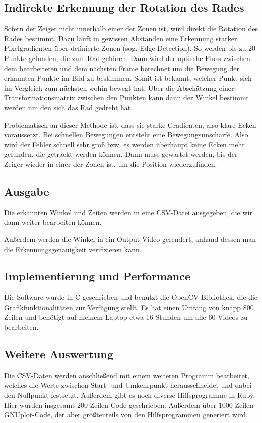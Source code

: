 \documentclass[a4paper,german,12pt,smallheadings]{scrartcl}
\begin{document}
\subsection{Indirekte Erkennung der Rotation des Rades}
Sofern der Zeiger nicht innerhalb einer der Zonen ist, wird direkt die Rotation
des Rades bestimmt. Dazu läuft in gewissen Abständen eine Erkennung starker
Pixelgradienten über definierte Zonen (sog. Edge Detection). So werden bis zu
20 Punkte gefunden, die zum Rad gehören. Dann wird der optische Fluss zwischen
dem bearbeiteten und dem nächsten Frame berechnet um die Bewegung der erkannten
Punkte im Bild zu bestimmen. Somit ist bekannt, welcher Punkt sich im Vergleich
zum nächsten wohin bewegt hat. Über die Abschätzung einer Transformationsmatrix
zwischen den Punkten kann dann der Winkel bestimmt werden um den sich das Rad
gedreht hat.

Problematisch an dieser Methode ist, dass sie starke Gradienten, also klare
Ecken voraussetzt. Bei schnellen Bewegungen entsteht eine Bewegungsunschärfe.
Also wird der Fehler schnell sehr groß bzw. es werden überhaupt keine Ecken
mehr gefunden, die getrackt werden können. Dann muss gewartet werden, bis der
Zeiger wieder in einer der Zonen ist, um die Position wiederzufinden.

\subsection{Ausgabe}
Die erkannten Winkel und Zeiten werden in eine CSV-Datei ausgegeben, die wir
dann weiter bearbeiten können.

Außerdem werden die Winkel in ein Output-Video gerendert, anhand dessen man die
Erkennungsgenauigkeit verifizieren kann.

\subsection{Implementierung und Performance}
Die Software wurde in C geschrieben und benutzt die OpenCV-Bibliothek, die die
Grafikfunktionalitäten zur Verfügung stellt. Es hat einen Umfang von knapp 800
Zeilen und benötigt auf meinem Laptop etwa 16 Stunden um alle 60 Videos zu
bearbeiten.

\subsection{Weitere Auswertung}
Die CSV-Daten werden anschließend mit einem weiteren Programm bearbeitet,
welches die Werte zwischen Start- und Umkehrpunkt herausschneidet und dabei den
Nullpunkt festsetzt. Außerdem gibt es noch diverse Hilfsprogramme in Ruby. Hier
wurden insgesamt 200 Zeilen Code geschrieben. Außerdem über 1000 Zeilen
GNUplot-Code, der aber größtenteils von den Hilfsprogrammen generiert wird.
\end{document}
